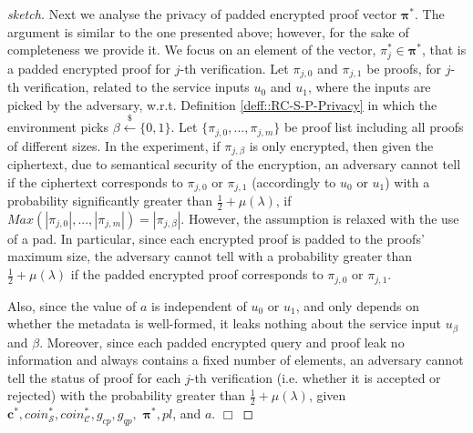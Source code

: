 \begin{proof}[sketch]
Next we analyse the privacy of padded encrypted proof vector $\bm{\pi}^{\scriptscriptstyle *}$. The argument is similar to the one presented above; however, for  the sake of completeness we provide it.  We focus on an element of the vector,  $\pi_{\scriptscriptstyle j}^{\scriptscriptstyle *}\in\bm{\pi}^{\scriptscriptstyle *}$, that is a padded encrypted proof for $j$-th verification. Let $\pi_{\scriptscriptstyle j,0}$ and $\pi_{\scriptscriptstyle j,1}$  be proofs, for $j$-th verification, related to the service inputs $u_{\scriptscriptstyle 0}$ and $u_{\scriptscriptstyle 1}$, where the inputs   are picked by the adversary, w.r.t. Definition  \ref{deff::RC-S-P-Privacy} in which  the environment picks $\beta\stackrel{\scriptscriptstyle\$}\leftarrow \{0,1\}$.  Let $\{\pi_{\scriptscriptstyle j,0},...,\pi_{\scriptscriptstyle j,m}\}$ be proof list including all proofs of different sizes. In the experiment, if $\pi_{\scriptscriptstyle j,\beta}$  is only   encrypted, then given the ciphertext, due to semantical security of the encryption, an adversary cannot tell if the ciphertext corresponds to $\pi_{\scriptscriptstyle j,0}$ or $\pi_{\scriptscriptstyle j,1}$  (accordingly to $u_{\scriptscriptstyle 0}$ or $u_{\scriptscriptstyle 1}$) with a probability significantly greater than $\frac{1}{2}+\mu(\lambda)$,  if $Max(|\pi_{\scriptscriptstyle j,0}|,...,|\pi_{\scriptscriptstyle j,m}|)=|\pi_{\scriptscriptstyle j,\beta}|$. However, the  assumption is  relaxed with the use of a pad. In particular, since each encrypted proof is padded  to the proofs' maximum size, the adversary cannot tell with a probability greater than $\frac{1}{2}+\mu(\lambda)$ if the  padded encrypted proof corresponds to  $\pi_{\scriptscriptstyle j,0}$ or $\pi_{\scriptscriptstyle j,1}$. 


Also, since the value of $a$ is independent of $u_{\scriptscriptstyle 0}$  or $u_{\scriptscriptstyle 1}$, and only depends on whether the metadata is well-formed, it leaks nothing about the service input $u_{\scriptscriptstyle\beta}$ and $\beta$. Moreover, since each padded encrypted query and proof leak no information and always contains a fixed number of elements, an adversary cannot tell the status of  proof for each $j$-th verification (i.e. whether it is accepted or rejected) with the probability greater than $\frac{1}{2}+\mu(\lambda)$, given  $\bm{c}^{\scriptscriptstyle *},coin^{\scriptscriptstyle *}_{\scriptscriptstyle \mathcal S},coin^{\scriptscriptstyle *}_{\scriptscriptstyle\mathcal C}, g_{\scriptscriptstyle cp},  g_{\scriptscriptstyle qp},$  $\bm{\pi}^{\scriptscriptstyle *},pl$, and $a$.
  \hfill\(\Box\)\end{proof}


